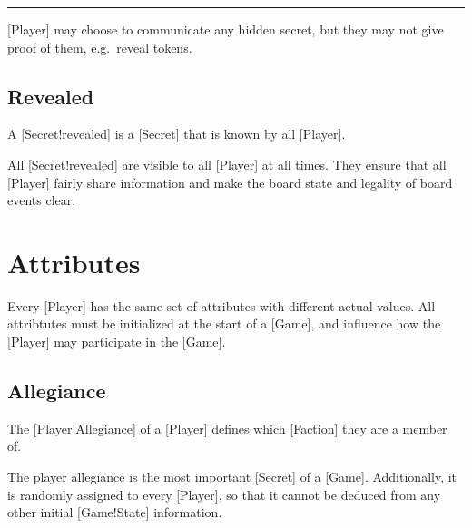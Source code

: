 \begin{rules}
    \rule{player.secret.hidden} [Player] may choose to communicate any hidden secret, but they may not give proof of them, e.g.\ reveal tokens.
\end{rules}

\subsection{Revealed}

A [Secret!revealed] is a [Secret] that is known by all [Player].

All [Secret!revealed] are visible to all [Player] at all times.
They ensure that all [Player] fairly share information and make the board state and legality of board events clear.


\section{Attributes}

Every [Player] has the same set of attributes with different actual values.
All attribtutes must be initialized at the start of a [Game], and influence how the [Player] may participate in the [Game].

\subsection{Allegiance}

The [Player!Allegiance] of a [Player] defines which [Faction] they are a member of.

The player allegiance is the most important [Secret] of a [Game].
Additionally, it is randomly assigned to every [Player], so that it cannot be deduced from any other initial [Game!State] information.

